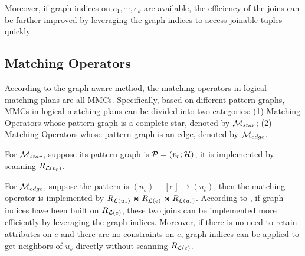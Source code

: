 Moreover, if graph indices on $e_1, \cdots, e_k$ are available, the efficiency of the joins can be further improved by leveraging the graph indices to access joinable tuples quickly.


\subsection{Matching Operators}
\label{sec:matching-operator}
According to the graph-aware method, the matching operators in logical matching plans are all MMCs.
Specifically, based on different pattern graphs, MMCs in logical matching plans can be divided into two categories: 
(1) Matching Operators whose pattern graph is a complete star, denoted by $\mathcal{M}_{star}$;
(2) Matching Operators whose pattern graph is an edge, denoted by $\mathcal{M}_{edge}$.

For $\mathcal{M}_{star}$, suppose its pattern graph is $\mathcal{P} = (v_r; \mathcal{H})$, it is implemented by scanning ${R_{\mathcal{L}(v_r)}}$.

For $\mathcal{M}_{edge}$, suppose the pattern is $(u_s) - [e] \rightarrow (u_t)$, then the matching operator is implemented by ${R_{\mathcal{L}(u_s)}} \Join {\ensuremath R_{\mathcal{L}(e)}} \Join {\ensuremath R_{\mathcal{L}(u_t)}}$.
According to , if graph indices have been built on ${R_{\mathcal{L}(e)}}$, these two joins can be implemented more efficiently by leveraging the graph indices.
Moreover, if there is no need to retain attributes on $e$ and there are no constraints on $e$, graph indices can be applied to get neighbors of $u_s$ directly without scanning ${R_{\mathcal{L}(e)}}$.

